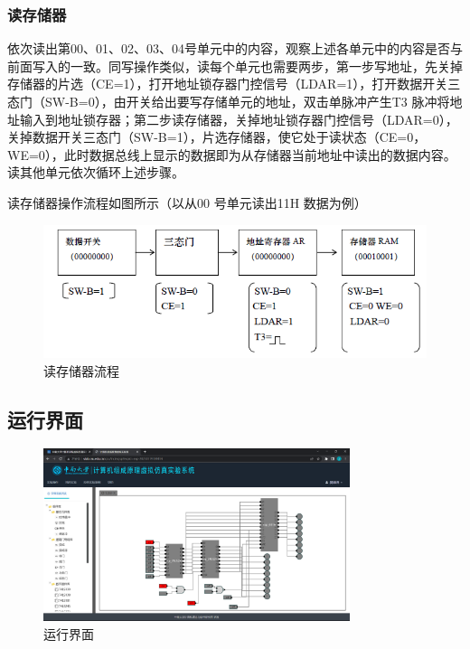 \documentclass[UTF8,12pt]{article}
\begin{document}
\subsubsection{读存储器}
依次读出第00、01、02、03、04号单元中的内容，观察上述各单元中的内容是否与前面写入的一致。同写操作类似，读每个单元也需要两步，第一步写地址，先关掉存储器的片选（CE=1），打开地址锁存器门控信号（LDAR=1），打开数据开关三态门（SW-B=0），由开关给出要写存储单元的地址，双击单脉冲产生T3 脉冲将地址输入到地址锁存器；第二步读存储器，关掉地址锁存器门控信号（LDAR=0），关掉数据开关三态门（SW-B=1），片选存储器，使它处于读状态（CE=0，WE=0），此时数据总线上显示的数据即为从存储器当前地址中读出的数据内容。读其他单元依次循环上述步骤。

读存储器操作流程如图所示（以从00 号单元读出11H 数据为例）

\begin{figure}[htbp]
    \centering
    \includegraphics[width=1.0\textwidth]{img/18.png}
    \caption{读存储器流程}
\end{figure}

\newpage

\subsection{运行界面}
\begin{figure}[htbp]
    \centering
    \includegraphics[width=0.8\textwidth]{img/16.png}
    \caption{运行界面}
\end{figure}
\end{document}

